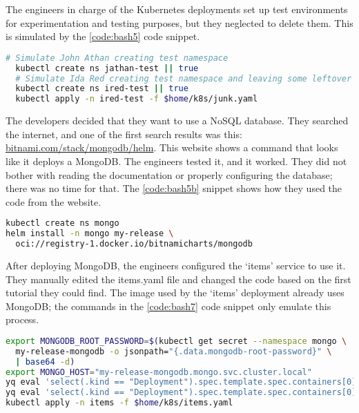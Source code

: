 The engineers in charge of the Kubernetes deployments set up test environments for experimentation and testing purposes, but they neglected to delete them. This is simulated by the \ref{code:bash5} code snippet.

\begin{lstlisting}[caption={Simulate leftover resources},language=bash,label=code:bash5]
  # Simulate John Athan creating test namespace
  kubectl create ns jathan-test || true
  # Simulate Ida Red creating test namespace and leaving some leftover resources in it
  kubectl create ns ired-test || true
  kubectl apply -n ired-test -f $home/k8s/junk.yaml
\end{lstlisting}

The developers decided that they want to use a NoSQL database. They searched the internet, and one of the first search results was this: \url{bitnami.com/stack/mongodb/helm}. This website shows a command that looks like it deploys a MongoDB. The engineers tested it, and it worked. They did not bother with reading the documentation or properly configuring the database; there was no time for that. The \ref{code:bash5b} snippet shows how they used the code from the website.

\begin{lstlisting}[caption={Deploy MongoDB},language=bash,label=code:bash5b]
kubectl create ns mongo
helm install -n mongo my-release \
  oci://registry-1.docker.io/bitnamicharts/mongodb
\end{lstlisting}

After deploying MongoDB, the engineers configured the `items' service to use it. They manually edited the items.yaml file and changed the code based on the first tutorial they could find. The image used by the `items' deployment already uses MongoDB; the commands in the \ref{code:bash7} code snippet only emulate this process.

\begin{lstlisting}[caption={Configuring the `items' app to use MongoDB},language=bash,label=code:bash7]
export MONGODB_ROOT_PASSWORD=$(kubectl get secret --namespace mongo \
  my-release-mongodb -o jsonpath="{.data.mongodb-root-password}" \
  | base64 -d)
export MONGO_HOST="my-release-mongodb.mongo.svc.cluster.local"
yq eval 'select(.kind == "Deployment").spec.template.spec.containers[0].env[0].value = env(MONGODB_ROOT_PASSWORD)' $home/k8s/items.yaml -i
yq eval 'select(.kind == "Deployment").spec.template.spec.containers[0].env[1].value = env(MONGO_HOST)' $home/k8s/items.yaml -i
kubectl apply -n items -f $home/k8s/items.yaml
\end{lstlisting}

